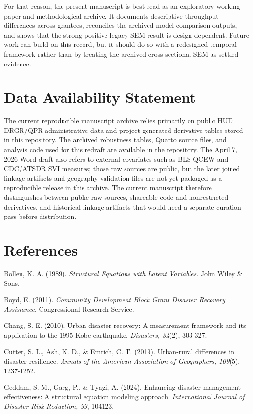 \documentclass[
  letterpaper,
]{article}
\begin{document}
For that reason, the present manuscript is best read as an exploratory
working paper and methodological archive. It documents descriptive
throughput differences across grantees, reconciles the archived model
comparison outputs, and shows that the strong positive legacy SEM result
is design-dependent. Future work can build on this record, but it should
do so with a redesigned temporal framework rather than by treating the
archived cross-sectional SEM as settled evidence.

\section{Data Availability Statement}\label{data-availability-statement}

The current reproducible manuscript archive relies primarily on public
HUD DRGR/QPR administrative data and project-generated derivative tables
stored in this repository. The archived robustness tables, Quarto source
files, and analysis code used for this redraft are available in the
repository. The April 7, 2026 Word draft also refers to external
covariates such as BLS QCEW and CDC/ATSDR SVI measures; those raw
sources are public, but the later joined linkage artifacts and
geography-validation files are not yet packaged as a reproducible
release in this archive. The current manuscript therefore distinguishes
between public raw sources, shareable code and nonrestricted
derivatives, and historical linkage artifacts that would need a separate
curation pass before distribution.

\section{References}\label{references}

Bollen, K. A. (1989). \emph{Structural Equations with Latent Variables}.
John Wiley \& Sons.

Boyd, E. (2011). \emph{Community Development Block Grant Disaster
Recovery Assistance}. Congressional Research Service.

Chang, S. E. (2010). Urban disaster recovery: A measurement framework
and its application to the 1995 Kobe earthquake. \emph{Disasters,
34}(2), 303-327.

Cutter, S. L., Ash, K. D., \& Emrich, C. T. (2019). Urban-rural
differences in disaster resilience. \emph{Annals of the American
Association of Geographers, 109}(5), 1237-1252.

Geddam, S. M., Garg, P., \& Tyagi, A. (2024). Enhancing disaster
management effectiveness: A structural equation modeling approach.
\emph{International Journal of Disaster Risk Reduction, 99}, 104123.
\end{document}
